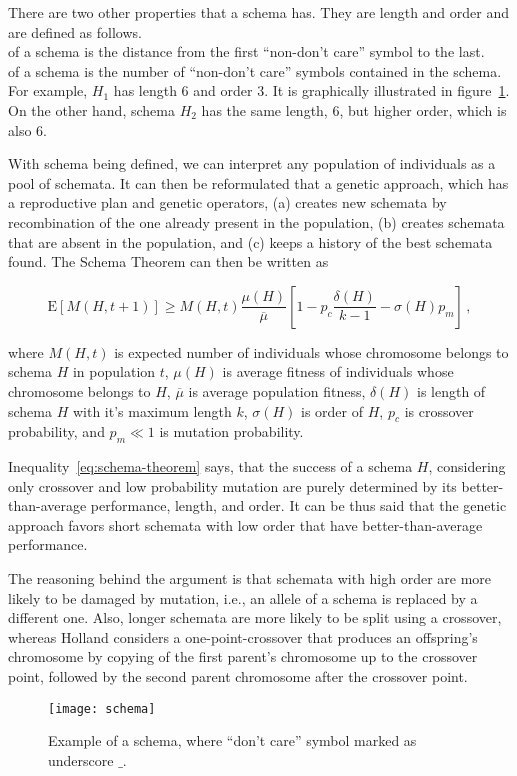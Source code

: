 There are two other properties that a schema has.
They are length and order and are defined as follows.\\

 of a schema is the distance from the first “non-don’t care” symbol to the last.\\

 of a schema is the number of “non-don’t care” symbols contained in the schema.\\

For example, $H_1$ has length $6$ and order $3$.
It is graphically illustrated in figure~\ref{fig:schema}.
On the other hand, schema $H_2$ has the same length, $6$, but higher order, which is also $6$.

With schema being defined, we can interpret any population of individuals as a pool of schemata.
It can then be reformulated that a genetic approach, which has a reproductive plan and
genetic operators, (a) creates new schemata by recombination of the one already present in the population,
(b) creates schemata that are absent in the population, and (c) keeps a history of the best schemata found.
The Schema Theorem can then be written as

\begin{equation}
    \mathrm{E}[M(H, t+1)] \geq M(H, t) \dfrac{\mu(H)}{\overline{\mu}}\left[ 1 - p_c \dfrac{\delta(H)}{k-1} - \sigma(H)
    p_m \right]\,,
    \label{eq:schema-theorem}
\end{equation}

where $M(H, t)$ is expected number of individuals whose chromosome belongs to schema $H$ in population $t$,
$\mu(H)$ is average fitness of individuals whose chromosome belongs to $H$,
$\overline{\mu}$ is average population fitness,
$\delta(H)$ is length of schema $H$ with it’s maximum length $k$,
$\sigma(H)$ is order of $H$,
$p_c$ is crossover probability, and
$p_m \ll 1$ is mutation probability.

Inequality~\ref{eq:schema-theorem} says, that the success of a schema $H$,
considering only crossover and low probability mutation are purely determined
by its better-than-average performance, length, and order.
It can be thus said that the genetic approach favors
short schemata with low order that have better-than-average performance.

The reasoning behind the argument is that schemata with high order are more likely
to be damaged by mutation, i.e., an allele of a schema is replaced by a different one.
Also, longer schemata are more likely to be split using a crossover, whereas Holland
considers a one-point-crossover that produces an offspring’s chromosome by copying
of the first parent’s chromosome up to the crossover point, followed by the second parent chromosome after the crossover point.

\begin{figure}[h]
    \texttt{[image: schema]}
    \caption[Example of a schema]{Example of a schema, where “don’t care” symbol marked as underscore $\_$.}
    \label{fig:schema}
\end{figure}
